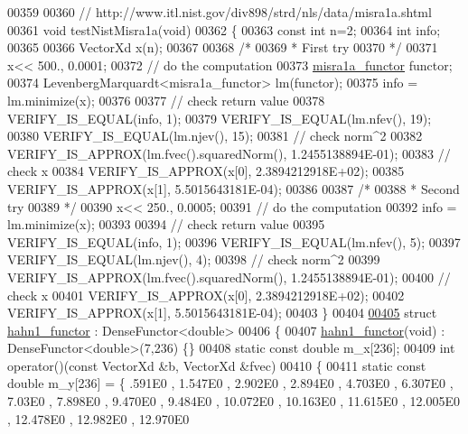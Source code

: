 \begin{DoxyCode}
00359 
00360 \textcolor{comment}{// http://www.itl.nist.gov/div898/strd/nls/data/misra1a.shtml}
00361 \textcolor{keywordtype}{void} testNistMisra1a(\textcolor{keywordtype}{void})
00362 \{
00363   \textcolor{keyword}{const} \textcolor{keywordtype}{int} n=2;
00364   \textcolor{keywordtype}{int} info;
00365 
00366   VectorXd x(n);
00367 
00368   \textcolor{comment}{/*}
00369 \textcolor{comment}{   * First try}
00370 \textcolor{comment}{   */}
00371   x<< 500., 0.0001;
00372   \textcolor{comment}{// do the computation}
00373   \hyperlink{structmisra1a__functor}{misra1a\_functor} functor;
00374   LevenbergMarquardt<misra1a\_functor> lm(functor);
00375   info = lm.minimize(x);
00376 
00377   \textcolor{comment}{// check return value}
00378   VERIFY\_IS\_EQUAL(info, 1);
00379   VERIFY\_IS\_EQUAL(lm.nfev(), 19);
00380   VERIFY\_IS\_EQUAL(lm.njev(), 15);
00381   \textcolor{comment}{// check norm^2}
00382   VERIFY\_IS\_APPROX(lm.fvec().squaredNorm(), 1.2455138894E-01);
00383   \textcolor{comment}{// check x}
00384   VERIFY\_IS\_APPROX(x[0], 2.3894212918E+02);
00385   VERIFY\_IS\_APPROX(x[1], 5.5015643181E-04);
00386 
00387   \textcolor{comment}{/*}
00388 \textcolor{comment}{   * Second try}
00389 \textcolor{comment}{   */}
00390   x<< 250., 0.0005;
00391   \textcolor{comment}{// do the computation}
00392   info = lm.minimize(x);
00393 
00394   \textcolor{comment}{// check return value}
00395   VERIFY\_IS\_EQUAL(info, 1);
00396   VERIFY\_IS\_EQUAL(lm.nfev(), 5);
00397   VERIFY\_IS\_EQUAL(lm.njev(), 4);
00398   \textcolor{comment}{// check norm^2}
00399   VERIFY\_IS\_APPROX(lm.fvec().squaredNorm(), 1.2455138894E-01);
00400   \textcolor{comment}{// check x}
00401   VERIFY\_IS\_APPROX(x[0], 2.3894212918E+02);
00402   VERIFY\_IS\_APPROX(x[1], 5.5015643181E-04);
00403 \}
00404 
\hyperlink{structhahn1__functor}{00405} \textcolor{keyword}{struct }\hyperlink{structhahn1__functor}{hahn1\_functor} : DenseFunctor<double>
00406 \{
00407     \hyperlink{structhahn1__functor}{hahn1\_functor}(\textcolor{keywordtype}{void}) : DenseFunctor<double>(7,236) \{\}
00408     \textcolor{keyword}{static} \textcolor{keyword}{const} \textcolor{keywordtype}{double} m\_x[236];
00409     \textcolor{keywordtype}{int} operator()(\textcolor{keyword}{const} VectorXd &b, VectorXd &fvec)
00410     \{
00411         \textcolor{keyword}{static} \textcolor{keyword}{const} \textcolor{keywordtype}{double} m\_y[236] = \{ .591E0 , 1.547E0 , 2.902E0 , 2.894E0 , 4.703E0 , 6.307E0 , 7.03E0 
       , 7.898E0 , 9.470E0 , 9.484E0 , 10.072E0 , 10.163E0 , 11.615E0 , 12.005E0 , 12.478E0 , 12.982E0 , 12.970E0 

\end{DoxyCode}

